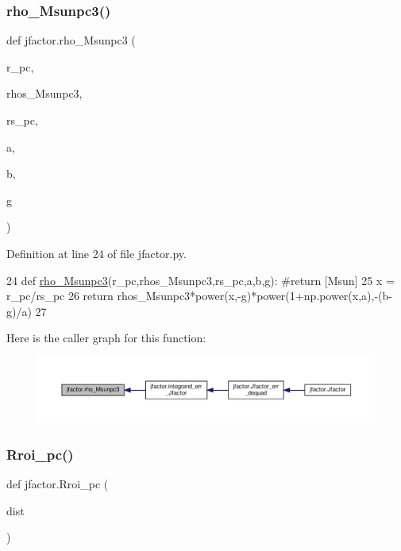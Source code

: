 \subsubsection{\texorpdfstring{rho\+\_\+\+Msunpc3()}{rho\_Msunpc3()}}
{\footnotesize\ttfamily def jfactor.\+rho\+\_\+\+Msunpc3 (\begin{DoxyParamCaption}\item[{}]{r\+\_\+pc,  }\item[{}]{rhos\+\_\+\+Msunpc3,  }\item[{}]{rs\+\_\+pc,  }\item[{}]{a,  }\item[{}]{b,  }\item[{}]{g }\end{DoxyParamCaption})}



Definition at line 24 of file jfactor.\+py.


\begin{DoxyCode}
24 \textcolor{keyword}{def }\hyperlink{namespacejfactor_aa60ca47daf4f993e2cc8bd268f7b206d}{rho\_Msunpc3}(r\_pc,rhos\_Msunpc3,rs\_pc,a,b,g): \textcolor{comment}{#return [Msun]}
25     x = r\_pc/rs\_pc
26     \textcolor{keywordflow}{return} rhos\_Msunpc3*power(x,-g)*power(1+np.power(x,a),-(b-g)/a)
27 
\end{DoxyCode}
Here is the caller graph for this function\+:\nopagebreak
\begin{figure}[H]
\begin{center}
\leavevmode
\includegraphics[width=350pt]{de/d47/namespacejfactor_aa60ca47daf4f993e2cc8bd268f7b206d_icgraph}
\end{center}
\end{figure}
\mbox{\label{namespacejfactor_ae5aad7f2ac90b82740c027677d7f4ac7}} 
\subsubsection{\texorpdfstring{Rroi\+\_\+pc()}{Rroi\_pc()}}
{\footnotesize\ttfamily def jfactor.\+Rroi\+\_\+pc (\begin{DoxyParamCaption}\item[{}]{dist }\end{DoxyParamCaption})}



